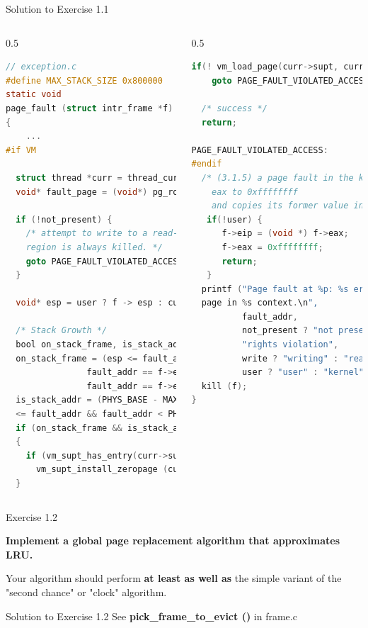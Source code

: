 \documentclass[10pt]{beamer}
\begin{document}
\begin{frame}[fragile]{Solution to Exercise 1.1}
\begin{columns}
\begin{column}{0.5\textwidth}
\begin{lstlisting}[language=C]
// exception.c
#define MAX_STACK_SIZE 0x800000
static void
page_fault (struct intr_frame *f) 
{
    ...
#if VM

  struct thread *curr = thread_current(); 
  void* fault_page = (void*) pg_round_down(fault_addr);

  if (!not_present) {
    /* attempt to write to a read-only 
    region is always killed. */
    goto PAGE_FAULT_VIOLATED_ACCESS;
  }

  void* esp = user ? f -> esp : curr -> current_esp;

  /* Stack Growth */
  bool on_stack_frame, is_stack_addr;
  on_stack_frame = (esp <= fault_addr || 
                fault_addr == f->esp - 4 || /**< PUSH */
                fault_addr == f->esp - 32); /**< PUSHA */
  is_stack_addr = (PHYS_BASE - MAX_STACK_SIZE
  <= fault_addr && fault_addr < PHYS_BASE);
  if (on_stack_frame && is_stack_addr) 
  {
    if (vm_supt_has_entry(curr->supt, fault_page) == false)
      vm_supt_install_zeropage (curr->supt, fault_page);
  }
\end{lstlisting}
\end{column}
\begin{column}{0.5\textwidth}
\begin{lstlisting}[language=C]
if(! vm_load_page(curr->supt, curr->pagedir, fault_page) ) 
    goto PAGE_FAULT_VIOLATED_ACCESS;

  /* success */
  return;

PAGE_FAULT_VIOLATED_ACCESS:
#endif
  /* (3.1.5) a page fault in the kernel merely sets
    eax to 0xffffffff
    and copies its former value into eip */
   if(!user) {
      f->eip = (void *) f->eax;
      f->eax = 0xffffffff;
      return;
   }
  printf ("Page fault at %p: %s error %s 
  page in %s context.\n",
          fault_addr,
          not_present ? "not present" : 
          "rights violation",
          write ? "writing" : "reading",
          user ? "user" : "kernel");
  kill (f);
}
\end{lstlisting}
\end{column}
\end{columns}
\end{frame}
\begin{frame}[fragile]{Exercise 1.2}

\textbf{Implement a global page replacement algorithm that approximates LRU.}

Your algorithm should perform \textbf{at least as well as} the simple variant of the "second chance" or "clock" algorithm.
\end{frame}
\begin{frame}[fragile]{Solution to Exercise 1.2}
See \textbf{pick\_frame\_to\_evict ()} in frame.c
\end{frame}
\end{document}
